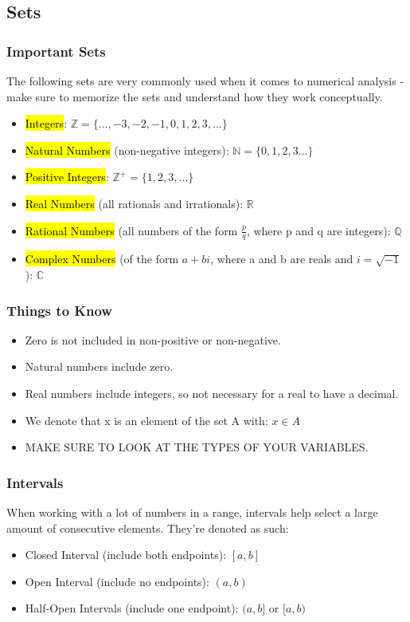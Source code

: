 \subsection{Sets}
\subsubsection{Important Sets}
The following sets are very commonly used when it comes to numerical analysis - make sure to memorize the sets and understand how they work conceptually.
\begin{itemize}
    \item \hl{Integers}: $\mathbb{Z}=\{...,-3,-2,-1,0,1,2,3,...\}$
    \item \hl{Natural Numbers} (non-negative integers): $\mathbb{N}=\{0,1,2,3...\}$
    \item \hl{Positive Integers}: $\mathbb{Z}^+=\{1,2,3,...\}$
    \item \hl{Real Numbers} (all rationals and irrationals): $\mathbb{R}$
    \item \hl{Rational Numbers} (all numbers of the form $\frac{p}{q}$, where p and q are integers): $\mathbb{Q}$ 
    \item \hl{Complex Numbers} (of the form $a+bi$, where a and b are reals and $i=\sqrt{-1}$): $\mathbb{C}$
\end{itemize}

\subsubsection{Things to Know}
\begin{itemize}
    \item Zero is not included in non-positive or non-negative.
    \item Natural numbers include zero.
    \item Real numbers include integers, so not necessary for a real to have a decimal.
    \item We denote that x is an element of the set A with: $x\in A$
    \item MAKE SURE TO LOOK AT THE TYPES OF YOUR VARIABLES.
\end{itemize}

\subsubsection{Intervals}
When working with a lot of numbers in a range, intervals help select a large amount of consecutive elements. They're denoted as such:
\begin{itemize}
    \item Closed Interval (include both endpoints): $[a,b]$
    \item Open Interval (include no endpoints): $(a,b)$
    \item Half-Open Intervals (include one endpoint): $(a,b]$ or $[a,b)$
\end{itemize}

